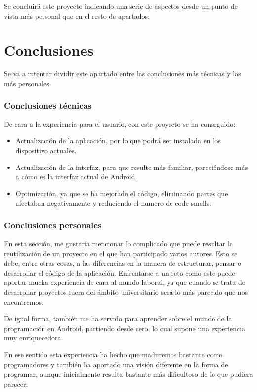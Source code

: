 Se concluirá este proyecto indicando una serie de aspectos desde un punto de vista más personal que en el resto de apartados:

\section{Conclusiones}

Se va a intentar dividir este apartado entre las conclusiones más técnicas y las más personales.

\subsubsection{Conclusiones técnicas}

De cara a la experiencia para el usuario, con este proyecto se ha conseguido:

\begin{itemize}
\item Actualización de la aplicación, por lo que podrá ser instalada en los dispositivo actuales.
\item Actualización de la interfaz, para que resulte más familiar, pareciéndose más a cómo es la interfaz actual de Android.
\item Optimización, ya que se ha mejorado el código, eliminando partes que afectaban negativamente y reduciendo el numero de code smells.
\end{itemize}

\subsubsection{Conclusiones personales}

En esta sección, me gustaría mencionar lo complicado que puede resultar la reutilización de un proyecto en el que han participado varios autores. Esto se debe, entre otras cosas, a las diferencias en la manera de estructurar, pensar o desarrollar el código de la aplicación. Enfrentarse a un reto como este puede aportar mucha experiencia de cara al mundo laboral, ya que cuando se trata de desarrollar proyectos fuera del ámbito universitario será lo más parecido que nos encontremos.

De igual forma, también me ha servido para aprender sobre el mundo de la programación en Android, partiendo desde cero, lo cual supone una experiencia muy enriquecedora.

En ese sentido esta experiencia ha hecho que maduremos bastante como programadores y también ha aportado una visión diferente en la forma de programar, aunque inicialmente resulta bastante más dificultoso de lo que pudiera parecer.

